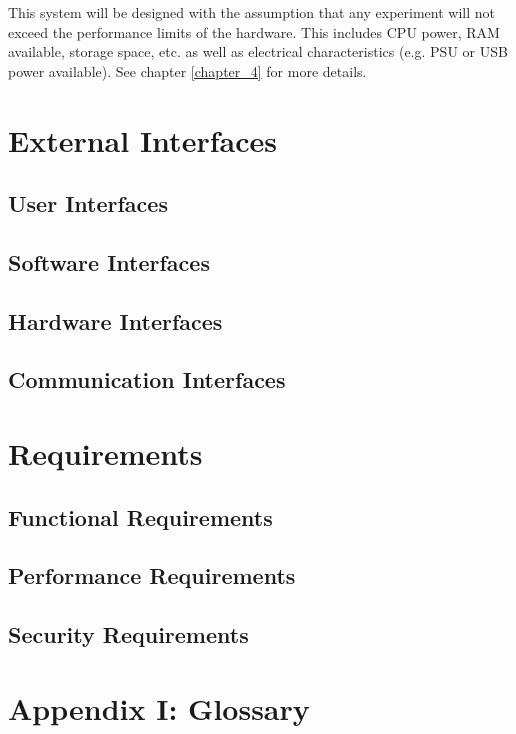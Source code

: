 \documentclass[english,titlepage,a4paper]{report}
\begin{document}
This system will be designed with the assumption that any experiment will not exceed the performance limits of the hardware.
This includes CPU power, RAM available, storage space, etc. as well as electrical characteristics (e.g. PSU or USB power available).
See chapter \ref{chapter_4} for more details.


\chapter{External Interfaces}
\section{User Interfaces}

\section{Software Interfaces}

\section{Hardware Interfaces}

\section{Communication Interfaces}


\chapter{Requirements}
\section{Functional Requirements}

\section{Performance Requirements}

\section{Security Requirements}


\chapter*{Appendix I: Glossary}
\end{document}
